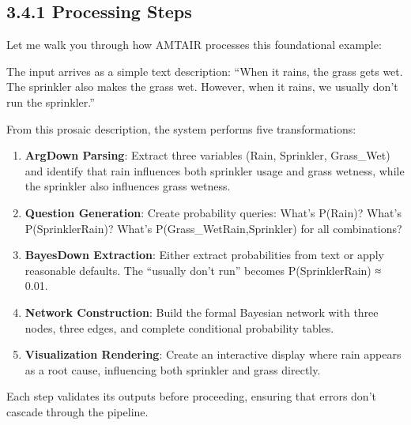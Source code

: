 \documentclass[
  11pt,
  letterpaper,
]{book}
\providecommand{\tightlist}{%
  \setlength{\itemsep}{0pt}\setlength{\parskip}{0pt}}
\begin{document}
\subsection{3.4.1 Processing Steps}\label{sec-rsg-processing}

Let me walk you through how AMTAIR processes this foundational example:

The input arrives as a simple text description: ``When it rains, the
grass gets wet. The sprinkler also makes the grass wet. However, when it
rains, we usually don't run the sprinkler.''

From this prosaic description, the system performs five transformations:

\begin{enumerate}
\def\labelenumi{\arabic{enumi}.}
\tightlist
\item
  \textbf{ArgDown Parsing}: Extract three variables (Rain, Sprinkler,
  Grass\_Wet) and identify that rain influences both sprinkler usage and
  grass wetness, while the sprinkler also influences grass wetness.
\item
  \textbf{Question Generation}: Create probability queries: What's
  P(Rain)? What's P(Sprinkler\textbar Rain)? What's
  P(Grass\_Wet\textbar Rain,Sprinkler) for all combinations?
\item
  \textbf{BayesDown Extraction}: Either extract probabilities from text
  or apply reasonable defaults. The ``usually don't run'' becomes
  P(Sprinkler\textbar Rain) ≈ 0.01.
\item
  \textbf{Network Construction}: Build the formal Bayesian network with
  three nodes, three edges, and complete conditional probability tables.
\item
  \textbf{Visualization Rendering}: Create an interactive display where
  rain appears as a root cause, influencing both sprinkler and grass
  directly.
\end{enumerate}

Each step validates its outputs before proceeding, ensuring that errors
don't cascade through the pipeline.
\end{document}
